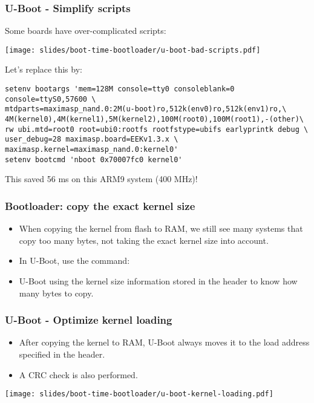 \begin{frame}[fragile]
\frametitle{U-Boot - Simplify scripts}
Some boards have over-complicated scripts:
\begin{center}
    \texttt{[image: slides/boot-time-bootloader/u-boot-bad-scripts.pdf]}
\end{center}
Let's replace this by:
\begin{block}{}
\footnotesize
\begin{verbatim}
setenv bootargs 'mem=128M console=tty0 consoleblank=0
console=ttyS0,57600 \
mtdparts=maximasp_nand.0:2M(u-boot)ro,512k(env0)ro,512k(env1)ro,\
4M(kernel0),4M(kernel1),5M(kernel2),100M(root0),100M(root1),-(other)\
rw ubi.mtd=root0 root=ubi0:rootfs rootfstype=ubifs earlyprintk debug \
user_debug=28 maximasp.board=EEKv1.3.x \
maximasp.kernel=maximasp_nand.0:kernel0'
setenv bootcmd 'nboot 0x70007fc0 kernel0'
\end{verbatim}
\end{block}
This saved 56 ms on this ARM9 system (400 MHz)!
\end{frame}

\begin{frame}
\frametitle{Bootloader: copy the exact kernel size}
\begin{itemize}
\item When copying the kernel from flash to RAM, we still see
      many systems that copy too many bytes, not taking the
      exact kernel size into account.
\item In U-Boot, use the \code{nboot} command:\\
\item U-Boot using the kernel size information stored in the
      \code{uImage} header to know how many bytes to copy.
\end{itemize}
\end{frame}

\begin{frame}
\frametitle{U-Boot - Optimize kernel loading}
\begin{itemize}
\item After copying the kernel  to RAM,
      U-Boot always moves it to the load address specified
      in the  header.
\item A CRC check is also performed.
\end{itemize}
\begin{center}
    \texttt{[image: slides/boot-time-bootloader/u-boot-kernel-loading.pdf]}
\end{center}
\end{frame}

